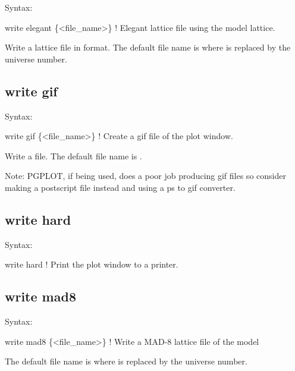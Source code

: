 {{{{{{{{{{{Syntax:
\begin{example}
    write elegant \{<file_name>\}           ! Elegant lattice file using the model lattice.
\end{example}

Write a lattice file in  format. The default file name is  where \vn{\#}
is replaced by the universe number.


\subsection{write gif}
\label{s:write.gif}

Syntax:
\begin{example}
    write gif \{<file_name>\}           ! Create a gif file of the plot window.
\end{example}

Write a  file. The default file name is .

Note: PGPLOT, if being used, does a poor job producing gif files so consider making a
postscript file instead and using a ps to gif converter.


\subsection{write hard}
\label{s:write.hard}

Syntax:
\begin{example}
    write hard                        ! Print the plot window to a printer.
\end{example}


\subsection{write mad8}
\label{s:write.mad8}

Syntax:
\begin{example}
    write mad8 \{<file_name>\}  ! Write a MAD-8 lattice file of the model
\end{example}

The default file name is  where \vn{\#} is replaced by the universe number. 

}}}}}}}}}}}
